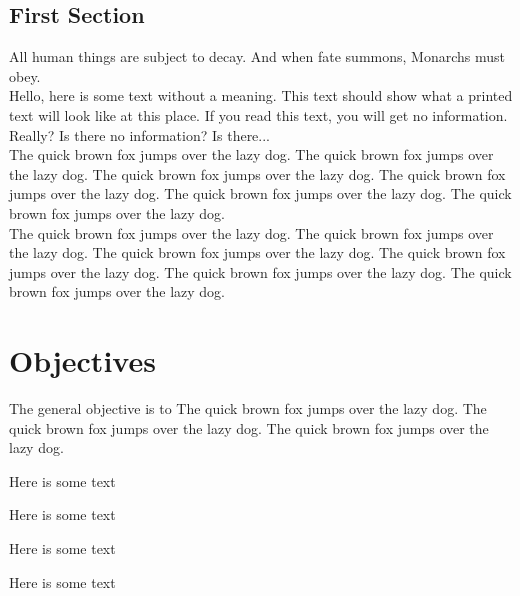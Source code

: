 \documentclass[11pt,a4paper]{report}
\begin{document}
\begin{multicols}{2}

\section{First Section}
\noindent
All human things are subject to decay. And when fate summons, Monarchs must obey.\\

Hello, here is some text without a meaning. This text should show what a printed text will look like at this place. If you read this text, you will get no information. Really?  Is there 
no information?  Is there...\\ 
The quick brown fox jumps over the lazy dog. The quick brown fox jumps over the lazy dog. The quick brown fox jumps over the lazy dog. The quick brown fox jumps over the lazy dog. The quick brown fox jumps over the lazy dog. The quick brown fox jumps over the lazy dog.\\ 
The quick brown fox jumps over the lazy dog. The quick brown fox jumps over the lazy dog. The quick brown fox jumps over the lazy dog. The quick brown fox jumps over the lazy dog. The quick brown fox jumps over the lazy dog. The quick brown fox jumps over the lazy dog.
\end{multicols}

\section{Objectives}
\label{sec:name}
The general objective is to
The quick brown fox jumps over the lazy dog. The quick brown fox jumps over the lazy dog. The quick brown fox jumps over the lazy dog.\\

\begin{tcolorbox}
Here is some text
\end{tcolorbox}

\begin{tcolorbox}[width=5cm]
Here is some text
\end{tcolorbox}

\begin{tcolorbox}[width=.5\textwidth, colframe=red]
Here is some text
\end{tcolorbox}

\begin{tcolorbox}[width=8cm, colframe=red, colback=blue!30, halign=right]
Here is some text
\end{tcolorbox}
\end{document}
